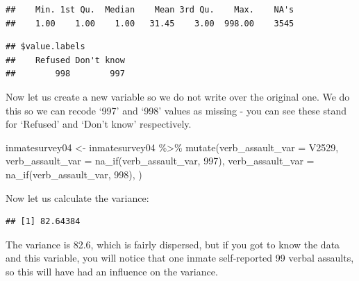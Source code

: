 \documentclass[
]{book}
\newenvironment{Shaded}{\begin{snugshade}}{\end{snugshade}}
\newcommand{\AttributeTok}[1]{\textcolor[rgb]{0.77,0.63,0.00}{#1}}
\newcommand{\ConstantTok}[1]{\textcolor[rgb]{0.00,0.00,0.00}{#1}}
\newcommand{\DecValTok}[1]{\textcolor[rgb]{0.00,0.00,0.81}{#1}}
\newcommand{\FunctionTok}[1]{\textcolor[rgb]{0.00,0.00,0.00}{#1}}
\newcommand{\NormalTok}[1]{#1}
\newcommand{\OtherTok}[1]{\textcolor[rgb]{0.56,0.35,0.01}{#1}}
\newcommand{\SpecialCharTok}[1]{\textcolor[rgb]{0.00,0.00,0.00}{#1}}
\begin{document}
\begin{verbatim}
##    Min. 1st Qu.  Median    Mean 3rd Qu.    Max.    NA's 
##    1.00    1.00    1.00   31.45    3.00  998.00    3545
\end{verbatim}

\begin{Shaded}
\end{Shaded}

\begin{verbatim}
## $value.labels
##    Refused Don't know 
##        998        997
\end{verbatim}

Now let us create a new variable so we do not write over the original one. We do this so we can recode `997' and `998' values as missing - you can see these stand for `Refused' and `Don't know' respectively.

\begin{Shaded}
\begin{Highlighting}[]
\NormalTok{inmatesurvey04 }\OtherTok{\textless{}{-}}\NormalTok{ inmatesurvey04 }\SpecialCharTok{\%\textgreater{}\%} 
  \FunctionTok{mutate}\NormalTok{(}\AttributeTok{verb\_assault\_var =}\NormalTok{ V2529,}
          \AttributeTok{verb\_assault\_var =} \FunctionTok{na\_if}\NormalTok{(verb\_assault\_var, }\DecValTok{997}\NormalTok{),}
          \AttributeTok{verb\_assault\_var =} \FunctionTok{na\_if}\NormalTok{(verb\_assault\_var, }\DecValTok{998}\NormalTok{),}
\NormalTok{         )}
\end{Highlighting}
\end{Shaded}

Now let us calculate the variance:

\begin{Shaded}
\end{Shaded}

\begin{verbatim}
## [1] 82.64384
\end{verbatim}

The variance is 82.6, which is fairly dispersed, but if you got to know the data and this variable, you will notice that one inmate self-reported 99 verbal assaults, so this will have had an influence on the variance.
\end{document}
